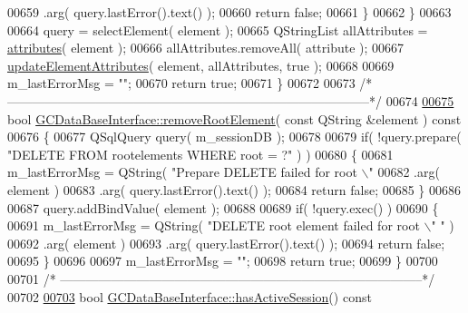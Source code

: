 \begin{DoxyCode}
{{{{{{{{{{{{{{{{{{{{{{{{{{{{{00659                        .arg( query.lastError().text() );
00660       \textcolor{keywordflow}{return} \textcolor{keyword}{false};
00661     \}
00662   \}
00663 
00664   query = selectElement( element );
00665   QStringList allAttributes = \hyperlink{class_g_c_data_base_interface_afb1e49e08f98ca453f9ac66340a35642}{attributes}( element );
00666   allAttributes.removeAll( attribute );
00667   \hyperlink{class_g_c_data_base_interface_abc13d0cb75b233fd83575bfef575ff19}{updateElementAttributes}( element, allAttributes, \textcolor{keyword}{true} );
00668 
00669   m\_lastErrorMsg = \textcolor{stringliteral}{""};
00670   \textcolor{keywordflow}{return} \textcolor{keyword}{true};
00671 \}
00672 
00673 \textcolor{comment}{/*
      --------------------------------------------------------------------------------------*/}
00674 
\hypertarget{gcdatabaseinterface_8cpp_source_l00675}{}\hyperlink{class_g_c_data_base_interface_adbace3a2d395dae9cd915238556a6f77}{00675} \textcolor{keywordtype}{bool} \hyperlink{class_g_c_data_base_interface_adbace3a2d395dae9cd915238556a6f77}{GCDataBaseInterface::removeRootElement}( \textcolor{keyword}{const} QString &element )\textcolor{keyword}{ const}
00676 \textcolor{keyword}{}\{
00677   QSqlQuery query( m\_sessionDB );
00678 
00679   \textcolor{keywordflow}{if}( !query.prepare( \textcolor{stringliteral}{"DELETE FROM rootelements WHERE root = ?"} ) )
00680   \{
00681     m\_lastErrorMsg = QString( \textcolor{stringliteral}{"Prepare DELETE failed for root \(\backslash\)"%
00682         .arg( element )
00683         .arg( query.lastError().text() );
00684     \textcolor{keywordflow}{return} \textcolor{keyword}{false};
00685   \}
00686 
00687   query.addBindValue( element );
00688 
00689   \textcolor{keywordflow}{if}( !query.exec() )
00690   \{
00691     m\_lastErrorMsg = QString( \textcolor{stringliteral}{"DELETE root element failed for root \(\backslash\)"%
      "} )
00692         .arg( element )
00693         .arg( query.lastError().text() );
00694     \textcolor{keywordflow}{return} \textcolor{keyword}{false};
00695   \}
00696 
00697   m\_lastErrorMsg = \textcolor{stringliteral}{""};
00698   \textcolor{keywordflow}{return} \textcolor{keyword}{true};
00699 \}
00700 
00701 \textcolor{comment}{/*
      --------------------------------------------------------------------------------------*/}
00702 
\hypertarget{gcdatabaseinterface_8cpp_source_l00703}{}\hyperlink{class_g_c_data_base_interface_a875e3999c9d91b5e0f59be8bdef54408}{00703} \textcolor{keywordtype}{bool} \hyperlink{class_g_c_data_base_interface_a875e3999c9d91b5e0f59be8bdef54408}{GCDataBaseInterface::hasActiveSession}()\textcolor{keyword}{ const}
}}}}}}}}}}}}}}}}}}}}}}}}}}}}}}
\end{DoxyCode}
